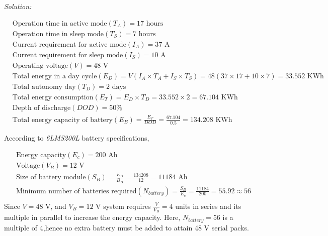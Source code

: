 \documentclass{home_assignment}
\begin{document}
      \textit{Solution:}
      \begin{fleqn}[\parindent]
        \begin{equation*}
           \begin{split}
            &\text{Operation time in active mode} (T_A)=17 \text{ hours}\\
            &\text{Operation time in sleep mode} (T_S)=7 \text{ hours}\\
            &\text{Current requirement for active mode} (I_A)=37 \text{ A}\\
            &\text{Current requirement for sleep mode} (I_S)=10 \text{ A}\\
            &\text{Operating voltage} (V)=48 \text{ V}\\
            &\text{Total energy in a day cycle} (E_D)= V(I_A\times T_A + I_S\times T_S)=48(37\times17+10\times7)=33.552 \text{ KWh}\\
            &\text{Total autonomy day} (T_D)=2 \text{ days}\\
            &\text{Total energy consumption} (E_T)=E_D\times T_D = 33.552\times2=67.104\text{ KWh}\\
            &\text{Depth of discharge} (DOD)=50\%\\
            &\text{Total energy capacity of battery} (E_B)=\frac{E_T}{DOD}=\frac{67.104}{0.5}=134.208\text{ KWh}
             \end{split}
           \end{equation*}
          \end{fleqn}
According to \textit{6LMS200L} battery specifications,
\begin{fleqn}[\parindent]
  \begin{equation*}
     \begin{split}
      &\text{Energy capacity} (E_c)=200 \text{ Ah}\\
      &\text{Voltage} (V_B)=12 \text{ V}\\
      &\text{Size of battery module} (S_{B})=\frac{E_B}{B_B} = \frac{134208}{12}=11184\text{ Ah}\\
      &\text{Minimum number of batteries required} (N_{battery})=\frac{S_{B}}{E_c} =\frac{11184}{200}=55.92\approx56\\
        \end{split}
     \end{equation*}
     Since $V=48$ V, and $V_B=12$ V system requires $\frac{V}{V_B}=4$ units in series and its multiple in parallel to increase the energy capacity. Here, $N_{battery}=56$ is a multiple of 4,hence no extra battery must be added to attain 48 V serial packs.
\end{fleqn}
\end{document}
